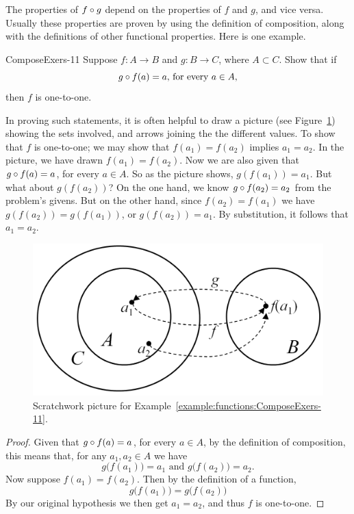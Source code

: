 The properties of $f \circ g$ depend on the properties of $f$ and $g$, and vice versa. Usually these properties are proven by using the definition of composition, along with the definitions of other functional properties.  Here is one example.

\begin{example}{ComposeExers-11}
Suppose $f\colon A \to B$ and $g \colon B \to C$, where $A \subset C$. Show that if 
$$\mbox{$g \circ f(a) = a$, for every $a \in A$,} $$
 then $f$ is one-to-one.
 
\begin{scratchwork}
In proving such statements, it is often helpful to draw a picture (see Figure~\ref{compose1}) showing the sets involved, and arrows joining the the different values. 
To show that $f$ is one-to-one; we may show that $f(a_1) = f(a_2)$ implies $a_1 = a_2$.  In the picture, we have drawn $f(a_1) = f(a_2)$. Now we are also given that $g \circ f(a) = a$, for every $a \in A$. So as the picture shows, $g(f(a_1)) = a_1$. But what about $g(f(a_2))$?  On the one hand, we know $g \circ f(a_2) = a_2$ from the problem's givens.  But on the other hand, since $f(a_2)=f(a_1)$ we have $g(f(a_2)) = g(f(a_1))$, or $g(f(a_2)) = a_1$. By substitution, it follows that $a_1=a_2$.
\end{scratchwork}

 \begin{figure}[h]
\includegraphics[width=4.5in]{images/compose1.png}
\caption{Scratchwork picture for Example~\ref{example:functions:ComposeExers-11}.}
\label{compose1}
\end{figure}

 \begin{proof}
Given that $g \circ f(a) = a$, for every $a \in A$, by the definition of composition, this means
that, for any $a_1, a_2 \in A$ we have
$$ g \bigl( f(a_1) \bigr) = a_1 \mbox{ and }  g \bigl( f(a_2) \bigr) = a_2.$$
Now suppose $f(a_1) = f(a_2)$. Then by the definition of a function, 
$$ g \bigl( f(a_1) \bigr) =  g \bigl( f(a_2) \bigr)$$
By our original hypothesis we then get $a_1 = a_2$, and thus $f$ is one-to-one.
\end{proof}    
 \end{example}

